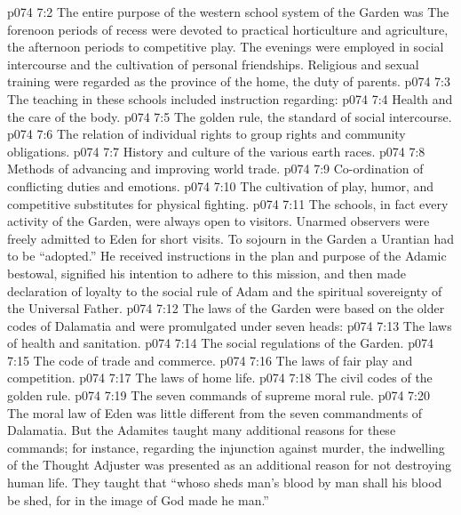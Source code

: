 \vs p074 7:2 The entire purpose of the western school system of the Garden was  The forenoon periods of recess were devoted to practical horticulture and agriculture, the afternoon periods to competitive play. The evenings were employed in social intercourse and the cultivation of personal friendships. Religious and sexual training were regarded as the province of the home, the duty of parents.
\vs p074 7:3 The teaching in these schools included instruction regarding:\plusone
\pc \vs p074 7:4 \bibnobreakspace Health and the care of the body.
\vs p074 7:5 \bibnobreakspace The golden rule, the standard of social intercourse.
\vs p074 7:6 \bibnobreakspace The relation of individual rights to group rights and community obligations.
\vs p074 7:7 \bibnobreakspace History and culture of the various earth races.
\vs p074 7:8 \bibnobreakspace Methods of advancing and improving world trade.
\vs p074 7:9 \bibnobreakspace Co\hyp{}ordination of conflicting duties and emotions.
\vs p074 7:10 \bibnobreakspace The cultivation of play, humor, and competitive substitutes for physical fighting.
\pc \vs p074 7:11 The schools, in fact every activity of the Garden, were always open to visitors. Unarmed observers were freely admitted to Eden for short visits. To sojourn in the Garden a Urantian had to be “adopted.” He received instructions in the plan and purpose of the Adamic bestowal, signified his intention to adhere to this mission, and then made declaration of loyalty to the social rule of Adam and the spiritual sovereignty of the Universal Father.\plusone
\pc \vs p074 7:12 The laws of the Garden were based on the older codes of Dalamatia and were promulgated under seven heads:
\pc \vs p074 7:13 \bibnobreakspace The laws of health and sanitation.
\vs p074 7:14 \bibnobreakspace The social regulations of the Garden.
\vs p074 7:15 \bibnobreakspace The code of trade and commerce.
\vs p074 7:16 \bibnobreakspace The laws of fair play and competition.
\vs p074 7:17 \bibnobreakspace The laws of home life.
\vs p074 7:18 \bibnobreakspace The civil codes of the golden rule.
\vs p074 7:19 \bibnobreakspace The seven commands of supreme moral rule.
\pc \vs p074 7:20 The moral law of Eden was little different from the seven commandments of Dalamatia. But the Adamites taught many additional reasons for these commands; for instance, regarding the injunction against murder, the indwelling of the Thought Adjuster was presented as an additional reason for not destroying human life. They taught that “whoso sheds man’s blood by man shall his blood be shed, for in the image of God made he man.”
